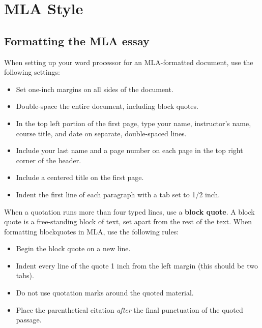 

\chapter{MLA Style} 


\section{Formatting the MLA essay}
When setting up your word processor for an MLA-formatted document, use the 
following settings:

\begin{itemize}
\item Set one-inch margins on all sides of the document.
\item Double-space the entire document, including block quotes.
\item In the top left portion of the first page, type your name, instructor's name, course title, and date on separate, double-spaced lines.
\item Include your last name and a page number on each page in the top right corner of the header.
\item Include a centered title on the first page.
\item Indent the first line of each paragraph with a tab set to 1/2 inch.
\end{itemize}

\newpage



When a quotation runs more than four typed lines, use a \textbf{block quote}. A block quote is a free-standing block of text, set apart from the rest of the text. When formatting blockquotes in MLA, use the following rules: 

\begin{itemize}
\item Begin the block quote on a new line. 
\item Indent every line of the quote 1 inch from the left margin (this should be two tabs). 
\item Do not use quotation marks around the quoted material. 
\item Place the parenthetical citation \emph{after} the final punctuation of the quoted passage.
\end{itemize}

